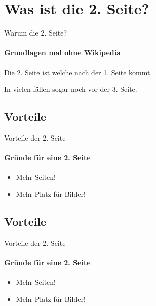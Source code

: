 \section{Was ist die 2. Seite?}

\begin{frame}{Warum die 2. Seite?}
\framesubtitle{Grundlagen mal ohne Wikipedia}
Die 2. Seite ist welche nach der 1. Seite kommt.

In vielen fällen sogar noch vor der 3. Seite.
\end{frame}


\subsection{Vorteile}

\begin{frame}{Vorteile der 2. Seite}
\framesubtitle{Gründe für eine 2. Seite}
\begin{itemize}
\item Mehr Seiten!
\pause
\item Mehr Platz für Bilder!
\end{itemize}
\end{frame}

\subsection{Vorteile}

\begin{frame}{Vorteile der 2. Seite}
\framesubtitle{Gründe für eine 2. Seite}
\begin{itemize}
\item Mehr Seiten!
\pause
\item Mehr Platz für Bilder!
\end{itemize}
\end{frame}

